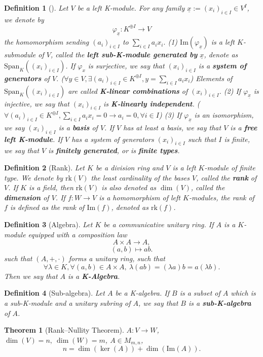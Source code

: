 \documentclass{article}
\theoremstyle{1}
\newtheorem{theorem}[problem]{Theorem}
\newtheorem{definition}{Definition}[section]
\begin{document}
\begin{definition}[]
    Let $V$ be a left K-module. For any family $\underline{x}:=\left(x_i\right)_{i\in I}\in V^I$, we denote by 
    $$\varphi_{\underline{x}}:K^{\oplus I}\longrightarrow V$$
    the homomorphism sending $(a_i)_{i\in I}$ to $\sum_{i\in I}a_ix_i.$
    \newline
    (1) $\mathrm{Im}\left(\varphi_{\underline{x}}\right)$ is a left $K$-submodule of $V$, called the \textbf{left sub-K-module generated by }$\underline{x}$, denote as $\mathrm{Span}_{K}\left((x_i)_{i\in I}\right)$. If $\varphi_{x}$ is surjective, we say that $(x_i)_{i\in I}$ is a \textbf{system of generators} of $V$.
    ($\forall y\in V,\exists (a_i)_{i\in I}\in K^{\oplus I}, y=\sum_{i\in I}a_ix_i$) Elements of $\mathrm{Span}_K\left((x_i)_{i\in I}\right)$ are called \textbf{K-linear combinations} of $(x_i)_{i\in I}$.
    \newline
    (2) If $\varphi_{\underline{x}}$ is injective, we say that $(x_i)_{i\in I}$ is \textbf{K-linearly independent}. ($\forall (a_i)_{i\in I}\in K^{\oplus I},\sum_{i\in I}a_ix_i=0\rightarrow a_i=0,\forall i\in I$)
    \newline
    (3) If $\varphi_{\underline{x}}$ is an isomorphism, we say $(x_i)_{i\in I}$ is a \textbf{basis} of $V$. If $V$ has at least a basis, we say that $V$ is a \textbf{free left K-module}. If $V$ has a system of generators $(x_i)_{i\in I}$ such that $I$ is finite, we say that $V$ is \textbf{finitely generated}, or is \textbf{finite types}.
\end{definition}
\begin{definition}[Rank]
    Let $K$ be a division ring and $V$ is a left $K$-module of finite type. We denote by $\mathrm{rk}(V)$ the least cardinality of the bases $V$, called the \textbf{rank} of $V$. If $K$ is a field, then $\mathrm{rk}(V)$ is also denoted as $\dim(V)$, called the \textbf{dimension} of $V$. If $f:W\longrightarrow V$ is a homomorphism of left $K$-modules, the rank of $f$ is defined as the rank of $\mathrm{Im}(f)$, denoted as $\mathrm{rk}(f)$.
\end{definition}
\begin{definition}[Algebra]
    Let $K$ be a communicative unitary ring. If $A$ is a $K$-module equipped with a  composition law 
        $$A\times A\longrightarrow A,$$
    $$(a,b)\longmapsto a b.$$
    such that $(A,+,\cdot)$ forms a unitary ring, such that
     $$\forall \lambda\in K,\forall (a,b)\in A\times A, \ \lambda\left(ab\right)=\left(\lambda a\right)b=a\left(\lambda b\right).$$
     Then we say that $A$ is a \textbf{K-Algebra}.
\end{definition}
\begin{definition}[Sub-algebra]
    Let $A$ be a K-algebra. If $B$ is a subset of $A$ which is a sub-K-module and a unitary subring of $A$, we say that $B$ is a \textbf{sub-K-algebra} of $A$.
\end{definition}
\begin{theorem}[Rank–Nullity Theorem]
    $A:V\longrightarrow W$, $\dim(V)=n,\ \dim(W)=m$, $A\in M_{m,n}$, 
    $$n=\dim(\ker(A))+\dim(\mathrm{Im}(A)).$$
\end{theorem}
\end{document}

